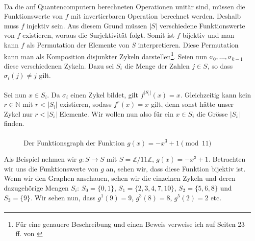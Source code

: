 \paragraph{}
Da die auf Quantencomputern berechneten Operationen unitär sind, müssen die Funktionswerte von $f$ mit invertierbaren Operation berechnet werden. Deshalb muss $f$ injektiv sein. Aus diesem Grund müssen $|S|$ verschiedene Funktionswerte von $f$ existieren, woraus die Surjektivität folgt. Somit ist $f$ bijektiv und man kann $f$ als Permutation der Elemente von $S$ interpretieren. Diese Permutation kann man als Komposition disjunkter Zykeln darstellen\footnote{Für eine genauere Beschreibung und einen Beweis verweise ich auf Seiten 23 ff. von \cite{perm}}.
Seien nun $\sigma_0, ..., \sigma_{k - 1}$ diese verschiedenen Zykeln. Dazu sei $S_i$ die Menge der Zahlen $j \in S$, so dass $\sigma_i(j) \neq j$ gilt.
\paragraph{}
Sei nun $x \in S_i$. Da $\sigma_i$ einen Zykel bildet, gilt $f^{|S_i|}(x) = x$. Gleichzeitig kann kein $r \in \mathbb{N}$ mit $r < |S_i|$ existieren, sodass $f^r(x) = x$ gilt, denn sonst hätte unser Zykel nur $r < |S_i|$ Elemente. Wir wollen nun also für ein $x \in S_i$ die Grösse $|S_i|$ finden.

\paragraph{}
\begin{wrapfigure}{l}{0.5\textwidth}

\caption{\small Der Funktionsgraph der Funktion $g(x) = -x^3 + 1 \pmod{11}$}
\end{wrapfigure}

Als Beispiel nehmen wir $g : S \rightarrow S$ mit $S = \mathbb{Z}/11\mathbb{Z}$, $g(x) = -x^3 + 1$. Betrachten wir uns die Funktionswerte von $g$ an, sehen wir, dass diese Funktion bijektiv ist. Wenn wir den Graphen anschauen, sehen wir die einzelnen Zykeln und deren dazugehörige Mengen $S_i$: $S_0 = \{0, 1\}$, $S_1 = \{2, 3, 4, 7, 10\}$, $S_2 = \{5, 6, 8\}$ und $S_3 = \{9\}$. Wir sehen nun, dass $g^1(9) = 9$, $g^3(8) = 8$, $g^5(2) = 2$ etc. 

\paragraph{}

